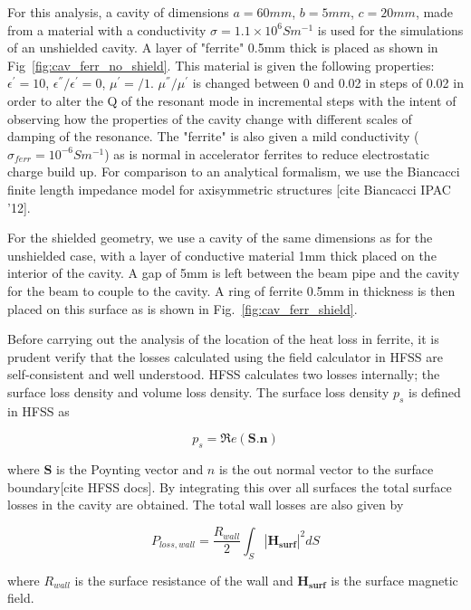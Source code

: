 For this analysis, a cavity of dimensions $a=60mm$, $b=5mm$, $c=20mm$, made from a material with a conductivity $\sigma = 1.1 \times 10^{6} S m^{-1}$ is used for the simulations of an unshielded cavity. A layer of "ferrite" 0.5mm thick is placed as shown in Fig~\ref{fig:cav_ferr_no_shield}. This material is given the following properties: $\epsilon^{'} = 10$, $\epsilon^{''}/\epsilon^{'} = 0$, $\mu^{'}=/1$. $\mu^{''}/ \mu^{'}$ is changed between 0 and 0.02 in steps of 0.02 in order to alter the Q of the resonant mode in incremental steps with the intent of observing how the properties of the cavity change with different scales of damping of the resonance. The "ferrite" is also given a mild conductivity ($\sigma_{ferr} = 10^{-6} S m^{-1}$) as is normal in accelerator ferrites to reduce electrostatic charge build up. For comparison to an analytical formalism, we use the Biancacci finite length impedance model for axisymmetric structures [cite Biancacci IPAC '12].

For the shielded geometry, we use a cavity of the same dimensions as for the unshielded case, with a layer of conductive material 1mm thick placed on the interior of the cavity. A gap of 5mm is left between the beam pipe and the cavity for the beam to couple to the cavity. A ring of ferrite 0.5mm in thickness is then placed on this surface as is shown in Fig.~\ref{fig:cav_ferr_shield}.

Before carrying out the analysis of the location of the heat loss in ferrite, it is prudent verify that the losses calculated using the field calculator in HFSS are self-consistent and well understood. HFSS calculates two losses internally; the surface loss density and volume loss density. The surface loss density $p_{s}$ is defined in HFSS as

\begin{equation}
p_{s} = \Re{}e \left( \mathbf{S}.\mathbf{n} \right)
\end{equation}

where $\mathbf{S}$ is the Poynting vector and $n$ is the out normal vector to the surface boundary[cite HFSS docs]. By integrating this over all surfaces the total surface losses in the cavity are obtained. The total wall losses are also given by 

\begin{equation}
P_{loss, wall} = \frac{R_{wall}}{2} \int_{S} \left| \mathbf{H_{surf}} \right|^{2} dS
\label{eqn:wall_losses}
\end{equation}

where $R_{wall}$ is the surface resistance of the wall and $\mathbf{H_{surf}}$ is the surface magnetic field.

